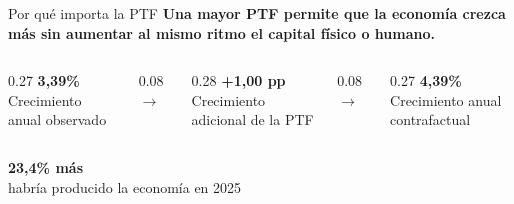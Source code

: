 \documentclass[aspectratio=169,11pt]{beamer}
\newcommand{\idea}[1]{\textbf{\color{cjcblue}#1}}
\begin{document}
\begin{frame}{Por qué importa la PTF}
  \idea{Una mayor PTF permite que la economía crezca más sin aumentar al mismo ritmo el capital físico o humano.}

  \vspace{0.55cm}
  \begin{columns}[c,totalwidth=\textwidth]
    \begin{column}{0.27\textwidth}
      \centering
      {\Huge\bfseries\color{cjcgray}3,39\%}\\[0.12cm]
      {\small Crecimiento anual observado}
    \end{column}
    \begin{column}{0.08\textwidth}
      \centering
      {\Huge\bfseries\color{cjcblue}$\rightarrow$}
    \end{column}
    \begin{column}{0.28\textwidth}
      \centering
      {\Huge\bfseries\color{cjcgold}+1,00 pp}\\[0.12cm]
      {\small Crecimiento adicional de la PTF}
    \end{column}
    \begin{column}{0.08\textwidth}
      \centering
      {\Huge\bfseries\color{cjcblue}$\rightarrow$}
    \end{column}
    \begin{column}{0.27\textwidth}
      \centering
      {\Huge\bfseries\color{cjcblue}4,39\%}\\[0.12cm]
      {\small Crecimiento anual contrafactual}
    \end{column}
  \end{columns}

  \vspace{0.65cm}
  \begin{center}
    {\Huge\bfseries\color{cjcblue}23,4\% más}\\[0.18cm]
    {\large habría producido la economía en 2025}
  \end{center}

  \vfill
\end{frame}

\end{document}
